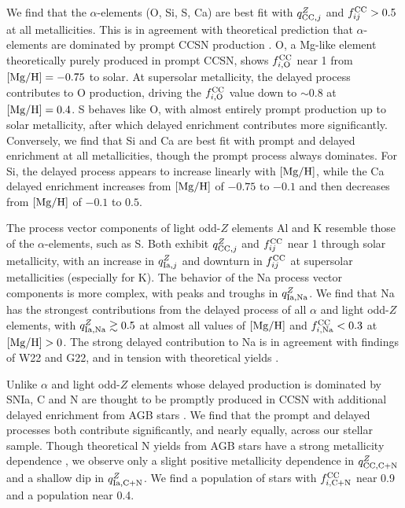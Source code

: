 \documentclass[modern]{aastex631}
\newcommand{\mgh}{[{\rm Mg}/{\rm H}]}
\newcommand{\qcc}{q_{{\rm CC,}j}^{Z}}
\newcommand{\qIa}{q_{{\rm Ia,}j}^{Z}}
\newcommand{\fcc}{f_{ij}^{\rm CC}}
\newcommand{\qccX}[1]{q_{{\rm CC, #1}}^{Z}}
\newcommand{\qIaX}[1]{q_{{\rm Ia, #1}}^{Z}}
\newcommand{\fccX}[1]{f_{i, {\rm #1}}^{\rm CC}}
\begin{document}
We find that the $\alpha$-elements (O, Si, S, Ca) are best fit with $\qcc$ and $\fcc > 0.5$ at all metallicities. This is in agreement with theoretical prediction that $\alpha$-elements are dominated by prompt CCSN production \citep[e.g.][]{andrews2017}. O, a Mg-like element theoretically purely produced in prompt CCSN, shows $\fccX{O}$ near 1 from $\mgh=-0.75$ to solar. At supersolar metallicity, the delayed process contributes to O production, driving the $\fccX{O}$ value down to $\sim 0.8$ at $\mgh=0.4$. S behaves like O, with almost entirely prompt production up to solar metallicity, after which delayed enrichment contributes more significantly. Conversely, we find that Si and Ca are best fit with prompt and delayed enrichment at all metallicities, though the prompt process always dominates. For Si, the delayed process appears to increase linearly with $\mgh$, while the Ca delayed enrichment increases from $\mgh$ of $-0.75$ to $-0.1$ and then decreases from $\mgh$ of $-0.1$ to $0.5$.

The process vector components of light odd-$Z$ elements Al and K resemble those of the $\alpha$-elements, such as S. Both exhibit $\qcc$ and $\fcc$ near 1 through solar metallicity, with an increase in $\qIa$ and downturn in $\fcc$ at supersolar metallicities (especially for K). The behavior of the Na process vector components is more complex, with peaks and troughs in $\qIaX{Na}$. We find that Na has the strongest contributions from the delayed process of all $\alpha$ and light odd-$Z$ elements, with $\qIaX{Na} \gtrsim 0.5$ at almost all values of $\mgh$ and $\fccX{Na} < 0.3$ at $\mgh > 0$. The strong delayed contribution to Na is in agreement with findings of W22 and G22, and in tension with theoretical yields \citep[e.g.][]{andrews2017, rybizki2017}.

Unlike $\alpha$ and light odd-$Z$ elements whose delayed production is dominated by SNIa, C and N are thought to be promptly produced in CCSN with additional delayed enrichment from AGB stars \citep[e.g.][]{andrews2017}. We find that the prompt and delayed processes both contribute significantly, and nearly equally, across our stellar sample. Though theoretical N yields from AGB stars have a strong metallicity dependence \citep{karakas2010, ventura2013, cristallo2015, johnson2022}, we observe only a slight positive metallicity dependence in $\qccX{C+N}$ and a shallow dip in $\qIaX{C+N}$. We find a population of stars with $\fccX{C+N}$ near 0.9 and a population near 0.4. 
\end{document}
